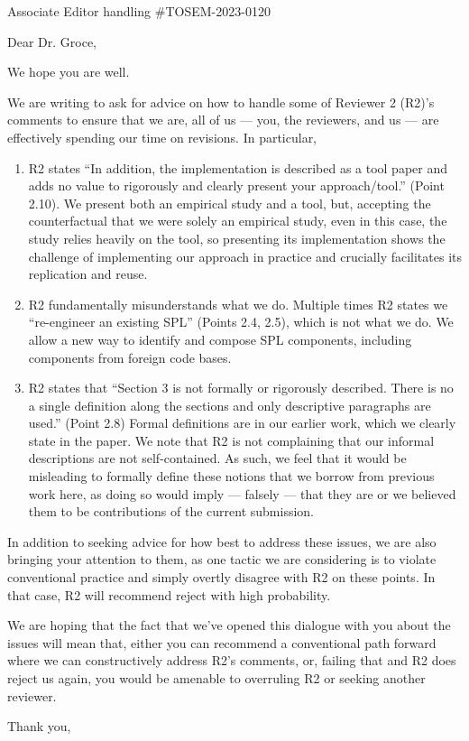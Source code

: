 \documentclass[a4paper,10pt]{letter}
\begin{document}
\begin{letter}
{
   Associate Editor handling \#TOSEM-2023-0120
}

\opening{Dear Dr. Groce,}


We hope you are well. 

We are writing to ask for advice on how to handle some of Reviewer 2 (R2)'s comments to ensure that we are, all of us --- you, the reviewers, and us --- are effectively spending our time on revisions.
In particular, 

\begin{enumerate}

\item R2 states ``In addition, the implementation is described as a tool paper and adds no value to rigorously and clearly present your approach/tool.'' (Point 2.10).  We present both an empirical study and a tool, but, accepting the counterfactual that we were solely an empirical study, even in this case, the study relies heavily on the tool, so presenting its implementation shows the challenge of implementing our approach in practice and crucially facilitates its replication and reuse.

\item R2 fundamentally misunderstands what we do. Multiple times R2 states we ``re-engineer an existing SPL'' (Points 2.4, 2.5), which is not what we do.  We allow a new way to identify and compose SPL components, 
including components from foreign code bases.

\item R2 states that ``Section 3 is not formally or rigorously described. There is no a single definition along the sections and only descriptive paragraphs are used.'' (Point 2.8) Formal definitions are in our earlier work, which we clearly state in the paper. We note that R2 is not complaining that our informal descriptions are not self-contained.  As such, we feel that it would be misleading to formally define these notions that we borrow from previous work here, as doing so would imply --- falsely --- that they are or we believed them to be contributions of the current submission.

\end{enumerate}

In addition to seeking advice for how best to address these issues, we are also bringing your attention to them, as one tactic we are considering is to violate conventional practice and simply overtly disagree with R2 on these points.  In that case, R2 will recommend reject with high probability.  

We are hoping that the fact that we've 
opened this dialogue with you about the issues will mean that, either you can recommend a conventional path forward where we can constructively address R2's comments, or, failing that and R2 does reject us again, 
you would be amenable to overruling R2 or seeking another reviewer.



\closing{Thank you,}
\end{letter}
\end{document}
